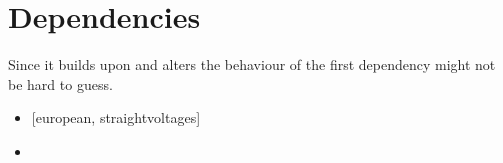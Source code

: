 \section{Dependencies}%
Since it builds upon and alters the behaviour of  the first
dependency might not be hard to guess.

\begin{multicols}{2}%
  \begin{itemize}[leftmargin=10pt]
    \item {} [european, straightvoltages]
    \item {}
  \end{itemize}
\end{multicols}%
